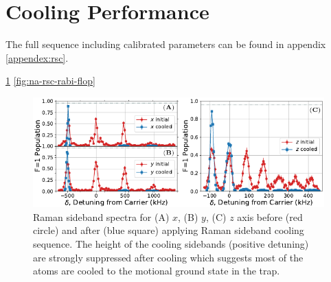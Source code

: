 \section{Cooling Performance}

The full sequence including calibrated parameters can be found in appendix \ref{appendex:rsc}.

\ref{fig:na-rsc-spectrum}
\ref{fig:na-rsc-rabi-flop}

\begin{figure}
  \centering
  \includegraphics[width=\textwidth]{figures/na_rsc_spectrum.pdf}
  \caption[Raman sideband spectra before and after cooling]{
    Raman sideband spectra for (A) $x$, (B) $y$, (C) $z$ axis before (red circle)
    and after (blue square) applying Raman sideband cooling sequence.
    The height of the cooling sidebands (positive detuning)
    are strongly suppressed after cooling which suggests most of the atoms are cooled
    to the motional ground state in the trap.
    \label{fig:na-rsc-spectrum}}
\end{figure}

